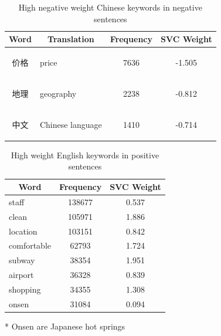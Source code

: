 \documentclass[review]{elsarticle}
\begin{document}
\begin{table}[bp] \centering
\caption{High negative weight Chinese keywords in negative sentences}
\label{tab:neg_keys_zh}
\begin{tabular}{|c|l|c|c|} \hline
\textbf{Word} & \multicolumn{1}{c|}{\textbf{Translation}} & \textbf{Frequency} & \textbf{SVC Weight} \\ \hline
\begin{CJK}{UTF8}{gbsn} 价格 \end{CJK} 
    & price & 7636 & -1.505 \\ \hline
\begin{CJK}{UTF8}{gbsn} 地理 \end{CJK} 
    & geography & 2238 & -0.812 \\ \hline
\begin{CJK}{UTF8}{gbsn} 中文 \end{CJK} 
    & Chinese language & 1410 & -0.714 \\ \hline
\end{tabular}
\end{table}

\begin{table}[bp]
\centering
\caption{High weight English keywords in positive sentences}
\label{tab:pos_keys_en}
\begin{threeparttable}
\begin{tabular}{|l|c|c|}
\hline
\multicolumn{1}{|c|}{\textbf{Word}} & \textbf{Frequency} & \textbf{SVC Weight} \\ \hline
staff & 138677 & 0.537 \\ \hline
clean & 105971 & 1.886 \\ \hline
location & 103151 & 0.842 \\ \hline
comfortable & 62793 & 1.724 \\ \hline
subway & 38354 & 1.951 \\ \hline
airport & 36328 & 0.839 \\ \hline
shopping & 34355 & 1.308 \\ \hline
onsen \tnote{*} & 31084 & 0.094 \\ \hline
\end{tabular}
\begin{tablenotes}
\item[*]Onsen are Japanese hot springs
\end{tablenotes}
\end{threeparttable}
\end{table}
\end{document}
